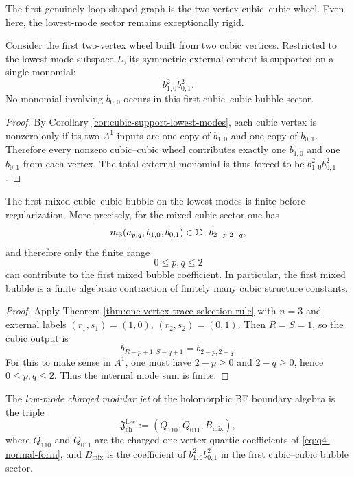 The first genuinely loop-shaped graph is the two-vertex cubic--cubic wheel. Even here, the
lowest-mode sector remains exceptionally rigid.

\begin{theorem}
Consider the first two-vertex wheel built from two cubic vertices. Restricted to the lowest-mode
subspace $L$, its symmetric external content is supported on a single monomial:
\[
b_{1,0}^2 b_{0,1}^2.
\]
No monomial involving $b_{0,0}$ occurs in this first cubic--cubic bubble sector.
\end{theorem}

\begin{proof}
By Corollary \ref{cor:cubic-support-lowest-modes}, each cubic vertex is nonzero only if its two
$A^1$ inputs are one copy of $b_{1,0}$ and one copy of $b_{0,1}$. Therefore every nonzero
cubic--cubic wheel contributes exactly one $b_{1,0}$ and one $b_{0,1}$ from each vertex. The
total external monomial is thus forced to be $b_{1,0}^2b_{0,1}^2$.
\end{proof}

\begin{theorem}
The first mixed cubic--cubic bubble on the lowest modes is finite before regularization. More
precisely, for the mixed cubic sector one has
\[
m_3(a_{p,q},b_{1,0},b_{0,1})\in \mathbb C\cdot b_{2-p,2-q},
\]
and therefore only the finite range
\[
0\le p,q\le 2
\]
can contribute to the first mixed bubble coefficient. In particular, the first mixed bubble is a
finite algebraic contraction of finitely many cubic structure constants.
\end{theorem}

\begin{proof}
Apply Theorem \ref{thm:one-vertex-trace-selection-rule} with $n=3$ and external labels
$(r_1,s_1)=(1,0)$, $(r_2,s_2)=(0,1)$. Then $R=S=1$, so the cubic output is
\[
b_{R-p+1,S-q+1}=b_{2-p,2-q}.
\]
For this to make sense in $A^1$, one must have $2-p\ge 0$ and $2-q\ge 0$, hence
$0\le p,q\le 2$. Thus the internal mode sum is finite.
\end{proof}

\begin{definition}
The \emph{low-mode charged modular jet} of the holomorphic BF boundary algebra is the triple
\begin{equation}
\mathfrak J_{\mathrm{ch}}^{\mathrm{low}}:=(Q_{110},Q_{011},B_{\mathrm{mix}}),
\end{equation}
where $Q_{110}$ and $Q_{011}$ are the charged one-vertex quartic coefficients of
\eqref{eq:q4-normal-form}, and $B_{\mathrm{mix}}$ is the coefficient of
$b_{1,0}^2b_{0,1}^2$ in the first cubic--cubic bubble sector.
\end{definition}

